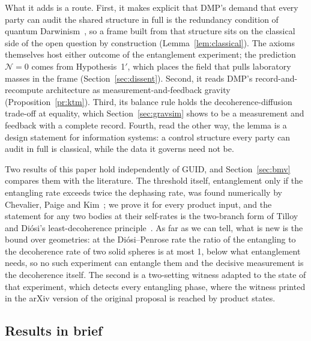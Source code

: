 \documentclass[11pt,a4paper]{article}
\begin{document}
What it adds is a route. First, it makes explicit that DMP's demand that every party can audit the shared structure in full is the
redundancy condition of quantum Darwinism~\cite{zurek,bph}, so a frame built from that structure sits on the classical side of the open
question by construction (Lemma~\ref{lem:classical}). The axioms themselves host either outcome of the entanglement experiment; the
prediction $\mathcal N=0$ comes from Hypothesis~1$'$, which places the field that pulls laboratory masses in the frame
(Section~\ref{sec:dissent}). Second, it reads DMP's record-and-recompute architecture as measurement-and-feedback gravity
(Proposition~\ref{pr:ktm}). Third, its balance rule holds the decoherence-diffusion trade-off at equality, which
Section~\ref{sec:gravsim} shows to be a measurement and feedback with a complete record. Fourth, read the other way, the lemma is a design
statement for information systems: a control structure every party can audit in full is classical, while the data it governs need not be.

Two results of this paper hold independently of GUID, and Section~\ref{sec:bmv} compares them with the literature. The threshold itself,
entanglement only if the entangling rate exceeds twice the dephasing rate, was found numerically by Chevalier, Paige and
Kim~\cite{chevalier2020}; we prove it for every product input, and the statement for any two bodies at their self-rates is the two-branch
form of Tilloy and Di\'osi's least-decoherence principle~\cite{tilloydiosi2017}. As far as we can tell, what is new is the bound over
geometries: at the Di\'osi--Penrose rate the ratio of the entangling to the decoherence rate of two solid spheres is at most 1, below what
entanglement needs, so no such experiment can entangle them and the decisive measurement is the decoherence itself. The second is a
two-setting witness adapted to the state of that experiment, which detects every entangling phase, where the witness printed in the arXiv
version of the original proposal is reached by product states.

\subsection{Results in brief}\label{sec:brief}
\end{document}
